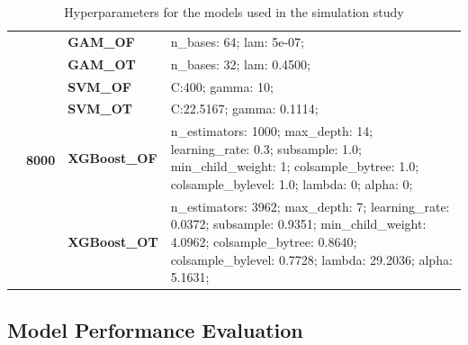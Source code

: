 \documentclass[runningheads]{llncs}
\begin{document}
\begin{table}
\begin{tabularx}{\textwidth}{>{\RaggedRight\arraybackslash}m{1.6cm}p{1.225cm}p{2.05cm}>{\RaggedRight\arraybackslash}X}
        \cline{2-4}
        \textbf{}                               & \multirow[t]{7}{*}{\textbf{8000}} & \textbf{GAM\_OF}     & n\_bases: 64; lam: 5e-07;                                                                                                                                                                         \\
        \textbf{}                               & \textbf{}                         & \textbf{GAM\_OT}     & n\_bases: 32; lam: 0.4500;                                                                                                                                                                        \\
        \textbf{}                               & \textbf{}                         & \textbf{SVM\_OF}     & C:\@400; gamma: 10;                                                                                                                                                                                \\
        \textbf{}                               & \textbf{}                         & \textbf{SVM\_OT}     & C:\@22.5167; gamma: 0.1114;                                                                                                                                                                        \\
        \textbf{}                               & \textbf{}                         & \textbf{XGBoost\_OF} & n\_estimators: 1000; max\_depth: 14; learning\_rate: 0.3; subsample: 1.0; min\_child\_weight: 1; colsample\_bytree: 1.0; colsample\_bylevel: 1.0; lambda: 0; alpha: 0;                            \\
        \textbf{}                               & \textbf{}                         & \textbf{XGBoost\_OT} & n\_estimators: 3962; max\_depth: 7; learning\_rate: 0.0372; subsample: 0.9351; min\_child\_weight: 4.0962; colsample\_bytree: 0.8640; colsample\_bylevel: 0.7728; lambda: 29.2036; alpha: 5.1631; \\
        \bottomrule
    \end{tabularx}
    \caption{Hyperparameters for the models used in the simulation study}
    \label{tab:model-hyperparameters}  %
\end{table}

\subsection{Model Performance Evaluation}
\end{document}
